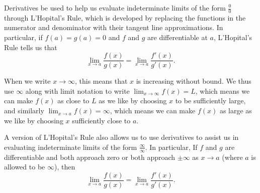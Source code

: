 \begin{summary}
\item Derivatives be used to help us evaluate indeterminate limits of the form $\frac{0}{0}$ through L'Hopital's Rule, which is developed by replacing the functions in the numerator and denominator with their tangent line approximations.  In particular, if $f(a) = g(a) = 0$ and $f$ and $g$ are differentiable at $a$, L'Hopital's Rule tells us that 
$$\lim_{x \to a}\frac{f(x)}{g(x)} = \lim_{x \to a}\frac{f'(x)}{g'(x)}.$$
\item When we write $x \to \infty$, this means that $x$ is increasing without bound.  We thus use $\infty$ along with limit notation to write $\lim_{x \to \infty} f(x) = L$, which means we can make $f(x)$ as close to $L$ as we like by choosing $x$ to be sufficiently large, and similarly $\lim_{x \to a} f(x) = \infty$, which means we can make $f(x)$ as large as we like by choosing $x$ sufficiently close to $a$.
\item A version of L'Hopital's Rule also allows us to use derivatives to assist us in evaluating indeterminate limits of the form $\frac{\infty}{\infty}$.  In particular, If $f$ and $g$ are differentiable and both approach zero or both approach $\pm \infty$ as $x \to a$ (where $a$ is allowed to be $\infty$), then
$$\lim_{x \to a} \frac{f(x)}{g(x)} = \lim_{x \to a} \frac{f'(x)}{g'(x)}.$$
\end{summary}

\nin \hrulefill

 

\clearpage
